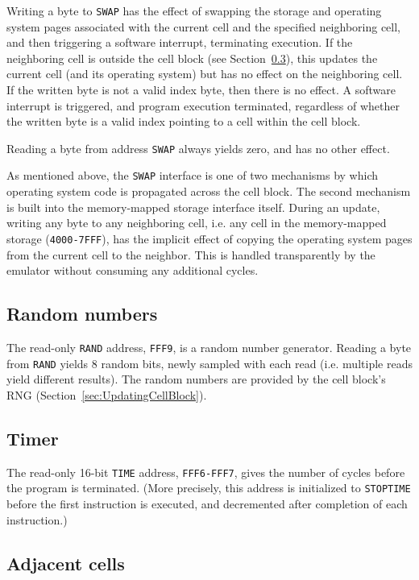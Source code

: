 \documentclass{article}
\newcommand\code[1]{{\tt #1}}
\newcommand\hex[1]{{\tt #1}}
\newcommand\hexrange[2]{\hex{#1}{\tt -}\hex{#2}}
\begin{document}
Writing a byte to \code{SWAP} has the effect of swapping the storage and operating system pages associated with the current cell and the specified neighboring cell,
and then triggering a software interrupt, terminating execution.
If the neighboring cell is outside the cell block (see Section~\ref{sec:AdjacentCells}),
this updates the current cell (and its operating system) but has no effect on the neighboring cell.
If the written byte is not a valid index byte, then there is no effect.
A software interrupt is triggered, and program execution terminated, regardless of whether the written byte is a valid index pointing to a cell within the cell block.

Reading a byte from address \code{SWAP} always yields zero, and has no other effect.

As mentioned above, the \code{SWAP} interface is one of two mechanisms by which operating system code is propagated across the cell block.
The second mechanism is built into the memory-mapped storage interface itself.
During an update, writing any byte to any neighboring cell, i.e. any cell in the memory-mapped storage (\hexrange{4000}{7FFF}),
has the implicit effect of copying the operating system pages from the current cell to the neighbor.
This is handled transparently by the emulator without consuming any additional cycles.

\subsection{Random numbers}

The read-only \code{RAND} address, \hex{FFF9}, is a random number generator.
Reading a byte from \code{RAND} yields 8 random bits, newly sampled with each read (i.e. multiple reads yield different results).
The random numbers are provided by the cell block's RNG (Section~\ref{sec:UpdatingCellBlock}).

\subsection{Timer}

The read-only 16-bit \code{TIME} address, \hexrange{FFF6}{FFF7}, gives the number of cycles before the program is terminated.
(More precisely, this address is initialized to \code{STOPTIME} before the first instruction is executed,
and decremented after completion of each instruction.)

\subsection{Adjacent cells}
\label{sec:AdjacentCells}
\end{document}
